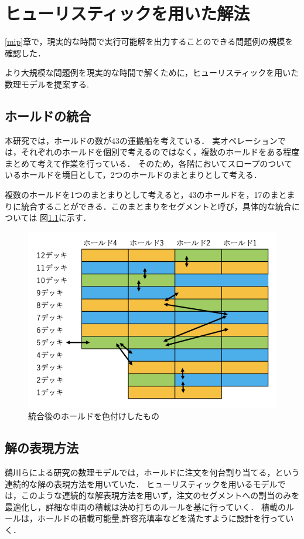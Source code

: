\chapter{ヒューリスティックを用いた解法}\label{method2}
\ref{mip}章で，現実的な時間で実行可能解を出力することのできる問題例の規模を確認した．

より大規模な問題例を現実的な時間で解くために，ヒューリスティックを用いた数理モデルを提案する.

\section{ホールドの統合}
本研究では，ホールドの数が43の運搬船を考えている．
実オペレーションでは，それぞれのホールドを個別で考えるのではなく，複数のホールドをある程度まとめて考えて作業を行っている．
そのため，各階においてスロープのついているホールドを境目として，2つのホールドのまとまりとして考える．

複数のホールドを1つのまとまりとして考えると，43のホールドを，17のまとまりに統合することができる．このまとまりをセグメントと呼び，具体的な統合については
図\ref{fig1}に示す．\\

\begin{figure}[H]
 \centering
 \includegraphics[slace=0.2]{segment.png}
 \caption{統合後のホールドを色付けしたもの}
 \label{fig1}
\end{figure}



\section{解の表現方法}
鵜川らによる研究の数理モデル\cite{ukawa}では，ホールドに注文を何台割り当てる，という連続的な解の表現方法を用いていた．
ヒューリスティックを用いるモデルでは，このような連続的な解表現方法を用いず，注文のセグメントへの割当のみを最適化し，詳細な車両の積載は決め打ちのルールを基に行っていく．
積載のルールは，ホールドの積載可能量,許容充填率などを満たすように設計を行っていく．

